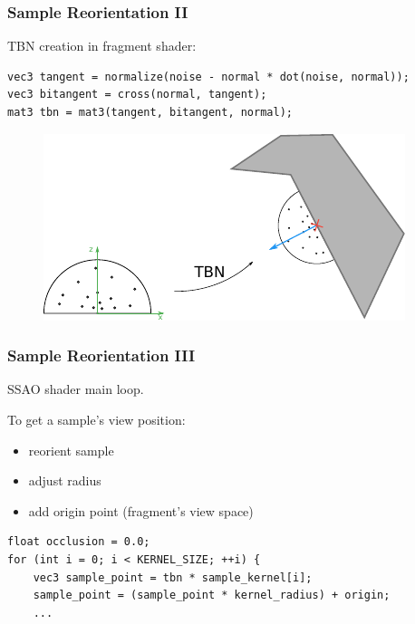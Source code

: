 \documentclass{beamer}
\begin{document}
\begin{frame}[fragile]
\frametitle{Sample Reorientation II}

TBN creation in fragment shader:
\begin{verbatim}
vec3 tangent = normalize(noise - normal * dot(noise, normal));
vec3 bitangent = cross(normal, tangent);
mat3 tbn = mat3(tangent, bitangent, normal);
\end{verbatim}

\vspace{-0.2cm}
\begin{figure}
    \centering
    \includegraphics[width=0.7\linewidth]{images/kernel_reorientation.pdf}
\end{figure}

\end{frame}

\begin{frame}[fragile]
\frametitle{Sample Reorientation III}
SSAO shader main loop.

To get a sample's view position:
\begin{itemize}
    \item reorient sample
    \item adjust radius
    \item add origin point (fragment's view space)
\end{itemize}
\begin{verbatim}
float occlusion = 0.0;
for (int i = 0; i < KERNEL_SIZE; ++i) {
    vec3 sample_point = tbn * sample_kernel[i];
    sample_point = (sample_point * kernel_radius) + origin;
    ...
\end{verbatim}

\end{frame}
\end{document}
